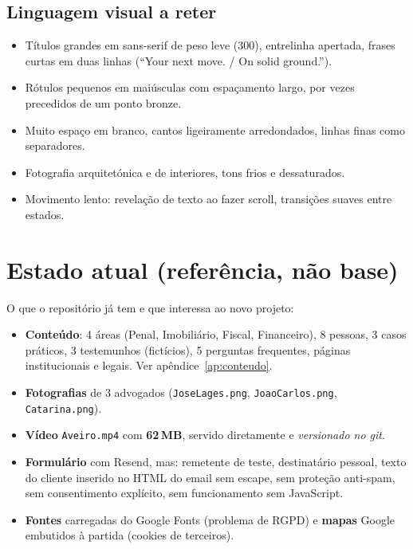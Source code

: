 \documentclass[11pt,a4paper]{article}
\begin{document}
\subsection{Linguagem visual a reter}
\begin{itemize}
  \item Títulos grandes em sans-serif de peso leve (300), entrelinha apertada, frases curtas em duas linhas (``Your next move. / On solid ground.'').
  \item Rótulos pequenos em maiúsculas com espaçamento largo, por vezes precedidos de um ponto bronze.
  \item Muito espaço em branco, cantos ligeiramente arredondados, linhas finas como separadores.
  \item Fotografia arquitetónica e de interiores, tons frios e dessaturados.
  \item Movimento lento: revelação de texto ao fazer scroll, transições suaves entre estados.
\end{itemize}

\section{Estado atual (referência, não base)}

O que o repositório já tem e que interessa ao novo projeto:
\begin{itemize}
  \item \textbf{Conteúdo}: 4 áreas (Penal, Imobiliário, Fiscal, Financeiro), 8 pessoas, 3 casos práticos, 3 testemunhos (fictícios), 5 perguntas frequentes, páginas institucionais e legais. Ver apêndice~\ref{ap:conteudo}.
  \item \textbf{Fotografias} de 3 advogados (\texttt{JoseLages.png}, \texttt{JoaoCarlos.png}, \texttt{Catarina.png}).
  \item \textbf{Vídeo} \texttt{Aveiro.mp4} com \textbf{62\,MB}, servido diretamente e \emph{versionado no git}.
  \item \textbf{Formulário} com Resend, mas: remetente de teste, destinatário pessoal, texto do cliente inserido no HTML do email sem escape, sem proteção anti-spam, sem consentimento explícito, sem funcionamento sem JavaScript.
  \item \textbf{Fontes} carregadas do Google Fonts (problema de RGPD) e \textbf{mapas} Google embutidos à partida (cookies de terceiros).
\end{itemize}
\end{document}
